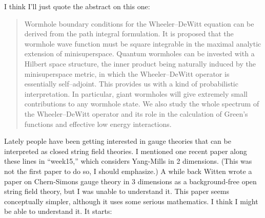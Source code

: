 \documentclass{article}
\def\tightlist{}
\renewcommand{\texttt}[1]{%
  \begingroup
  \ttfamily
  \begingroup\lccode`~=`/\lowercase{\endgroup\def~}{/\discretionary{}{}{}}%
  \begingroup\lccode`~=`[\lowercase{\endgroup\def~}{[\discretionary{}{}{}}%
  \begingroup\lccode`~=`.\lowercase{\endgroup\def~}{.\discretionary{}{}{}}%
  \catcode`/=\active\catcode`[=\active\catcode`.=\active
  \scantokens{#1\noexpand}%
  \endgroup
}
\begin{document}

I think I'll just quote the abstract on this one:

\begin{quote}
Wormhole boundary conditions for the Wheeler--DeWitt equation can be
derived from the path integral formulation. It is proposed that the
wormhole wave function must be square integrable in the maximal analytic
extension of minisuperspace. Quantum wormholes can be invested with a
Hilbert space structure, the inner product being naturally induced by
the minisuperspace metric, in which the Wheeler--DeWitt operator is
essentially self--adjoint. This provides us with a kind of probabilistic
interpretation. In particular, giant wormholes will give extremely small
contributions to any wormhole state. We also study the whole spectrum of
the Wheeler--DeWitt operator and its role in the calculation of Green's
functions and effective low energy interactions.
\end{quote}


Lately people have been getting interested in gauge theories that can be
interpreted as closed string field theories. I mentioned one recent
paper along these lines in ``week15,'' which considers Yang-Mills in 2
dimensions. (This was not the first paper to do so, I should emphasize.)
A while back Witten wrote a paper on Chern-Simons gauge theory in 3
dimensions as a background-free open string field theory, but I was
unable to understand it. This paper seems conceptually simpler, although
it uses some serious mathematics. I think I might be able to understand
it. It starts:
\end{document}
